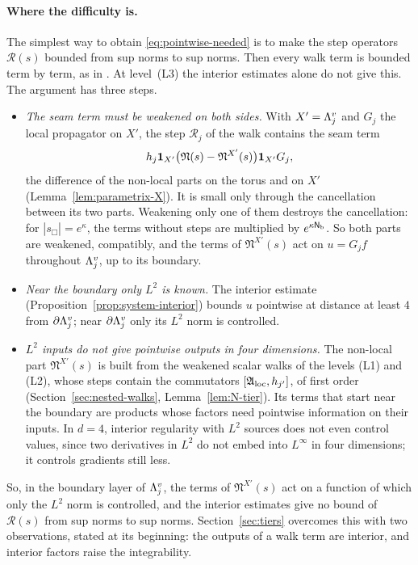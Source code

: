 \paragraph{Where the difficulty is.} The simplest way to obtain \eqref{eq:pointwise-needed} is to make the step operators $\mathcal R(s)$ bounded from sup norms to sup norms. Then every walk term is bounded term by term, as in \cite[(97)--(99)]{DimockI}. At level~(L3) the interior estimates alone do not give this. The argument has three steps.
\begin{itemize}
\item \emph{The seam term must be weakened on both sides.} With $X'=\Lambda^v_j$ and $G_j$ the local propagator on $X'$, the step $\mathcal R_j$ of the walk contains the seam term
\[
h_j\mathbf 1_{X'}\big(\mathfrak N(s)-\mathfrak N^{X'}(s)\big)\mathbf 1_{X'}G_j ,
\]
the difference of the non-local parts on the torus and on $X'$ (Lemma~\ref{lem:parametrix-X}). It is small only through the cancellation between its two parts. Weakening only one of them destroys the cancellation: for $|s_\Box|=e^\kappa$, the terms without steps are multiplied by $e^{\kappa\mathsf N_{\rm b}}$. So both parts are weakened, compatibly, and the terms of $\mathfrak N^{X'}(s)$ act on $u=G_jf$ throughout $\Lambda^v_j$, up to its boundary.
\item \emph{Near the boundary only $L^2$ is known.} The interior estimate (Proposition~\ref{prop:system-interior}) bounds $u$ pointwise at distance at least $4$ from $\partial\Lambda^v_j$; near $\partial\Lambda^v_j$ only its $L^2$ norm is controlled.
\item \emph{$L^2$ inputs do not give pointwise outputs in four dimensions.} The non-local part $\mathfrak N^{X'}(s)$ is built from the weakened scalar walks of the levels (L1) and (L2), whose steps contain the commutators $[\mathfrak A_{\rm loc},h_{j'}]$, of first order (Section~\ref{sec:nested-walks}, Lemma~\ref{lem:N-tier}). Its terms that start near the boundary are products whose factors need pointwise information on their inputs. In $d=4$, interior regularity with $L^2$ sources does not even control values, since two derivatives in $L^2$ do not embed into $L^\infty$ in four dimensions; it controls gradients still less.
\end{itemize}
So, in the boundary layer of $\Lambda^v_j$, the terms of $\mathfrak N^{X'}(s)$ act on a function of which only the $L^2$ norm is controlled, and the interior estimates give no bound of $\mathcal R(s)$ from sup norms to sup norms. Section~\ref{sec:tiers} overcomes this with two observations, stated at its beginning: the outputs of a walk term are interior, and interior factors raise the integrability.

